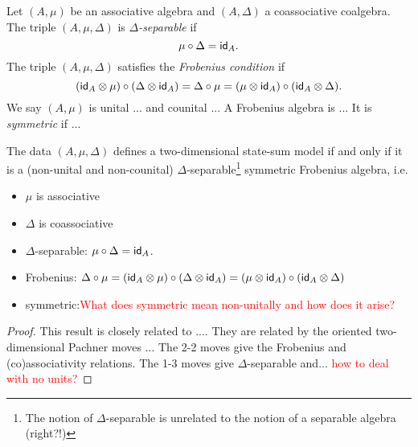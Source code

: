 \begin{definition}
	Let $(A, \mu)$ be an associative algebra and $(A,\Delta)$ a coassociative coalgebra.
	The triple $(A,\mu,\Delta)$ is \textit{$\Delta$-separable} if
	\[
	\mu \circ \Delta = \mathsf{id}_A.
	\]
	The triple $(A,\mu,\Delta)$ satisfies the \textit{Frobenius condition} if
	\[
	(\mathsf{id}_A \otimes \mu) \circ (\Delta \otimes \mathsf{id}_A) = \Delta \circ \mu = (\mu \otimes \mathsf{id}_A) \circ (\mathsf{id}_A \otimes \Delta).
	\]
	We say $(A,\mu)$ is unital ... and counital ...
	A Frobenius algebra is ...
	It is \textit{symmetric} if ...
\end{definition}

\begin{theorem}

\end{theorem}

\begin{theorem}
    The data $(A, \mu, \Delta)$ defines a two-dimensional state-sum model if and only if it is a (non-unital and non-counital) $\Delta$-separable\footnote{The notion of $\Delta$-separable is unrelated to the notion of a separable algebra (right?!)} symmetric Frobenius algebra, i.e.
    \begin{itemize}
        \item $\mu$ is associative
        \item $\Delta$ is coassociative
        \item $\Delta$-separable: $\mu \circ \Delta = \mathsf{id}_A$.
        \item Frobenius: $\Delta \circ \mu = (\mathsf{id}_A \otimes \mu) \circ (\Delta \otimes \mathsf{id}_A) = (\mu \otimes \mathsf{id}_A) \circ (\mathsf{id}_A \otimes \Delta)$
        \item symmetric:\textcolor{red}{What does symmetric mean non-unitally and how does it arise?}
    \end{itemize}
\end{theorem}

\begin{proof}
    This result is closely related to \cite[Proposition 3.4]{carqueville2016orbifoldcompletion}....
    They are related by the oriented two-dimensional Pachner moves \cite[Example 3.4(i)]{carqueville2019orbifolds}...
    The 2-2 moves give the Frobenius and (co)associativity relations.
    The 1-3 moves give $\Delta$-separable and... \textcolor{red}{how to deal with no units?}
\end{proof}
